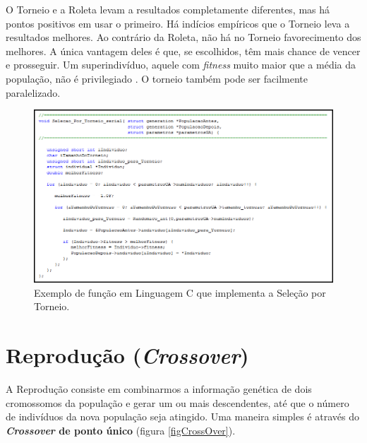 	O Torneio e a Roleta levam a resultados completamente diferentes, mas há pontos positivos em usar o primeiro. Há indícios empíricos que o Torneio leva a resultados melhores. Ao contrário da Roleta, não há no Torneio favorecimento dos melhores. A única vantagem deles é que, se escolhidos, têm mais chance de vencer e prosseguir. Um superindivíduo, aquele com \emph{fitness} muito maior que a média da população, não é privilegiado \cite{Linden2008}. O torneio também pode ser facilmente paralelizado.
	
	\begin{figure}[htp]
		\begin{center}
			\includegraphics[width=1.0\textwidth]{figs/ga/codigoSelecaoTorneio.png}
		\end{center}
		\caption{\label{fig:codigoSelecaoTorneio}Exemplo de função em Linguagem C que implementa a Seleção por Torneio.}
	\end{figure}
	
	
	\section{\label{crossover}Reprodução (\textit{Crossover})}

	A Reprodução consiste em combinarmos a informação genética de dois cromossomos da população e gerar um ou mais descendentes, até que o número de indivíduos da nova população seja atingido. Uma maneira simples é através do \textbf{\textit{Crossover} de ponto único} (figura \ref{figCrossOver}).
	
